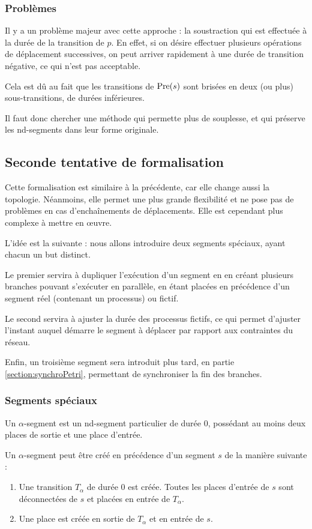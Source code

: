 \subsubsection{Problèmes}
Il y a un problème majeur avec cette approche : la soustraction qui est effectuée à la durée de la transition de $p$. En effet, si on désire effectuer plusieurs opérations de déplacement successives, on peut arriver rapidement à une durée de transition négative, ce qui n'est pas acceptable. 

Cela est dû au fait que les transitions de $\operatorname{Pre}(s)$ sont brisées en deux (ou plus) sous-transitions, de durées inférieures.

Il faut donc chercher une méthode qui permette plus de souplesse, et qui préserve les nd-segments dans leur forme originale.

\subsection{Seconde tentative de formalisation}
Cette formalisation est similaire à la précédente, car elle change aussi la topologie. Néanmoins, elle permet une plus grande flexibilité et ne pose pas de problèmes en cas d'enchaînements de déplacements.
Elle est cependant plus complexe à mettre en œuvre.

L'idée est la suivante : nous allons introduire deux segments spéciaux, ayant chacun un but distinct.

Le premier servira à dupliquer l'exécution d'un segment en en créant plusieurs branches pouvant s'exécuter en parallèle, en étant placées en précédence d'un segment réel (contenant un processus) ou fictif.

Le second servira à ajuster la durée des processus fictifs, ce qui permet d'ajuster l'instant auquel démarre le segment à déplacer par rapport aux contraintes du réseau.

Enfin, un troisième segment sera introduit plus tard, en partie \ref{section:synchroPetri}, permettant de synchroniser la fin des branches.

\subsubsection{Segments spéciaux}
\label{section:alphasegment}
\begin{mydef}
Un $\alpha$-segment est un nd-segment particulier de durée $0$, possédant au moins deux places de sortie et une place d'entrée.
\end{mydef}
Un $\alpha$-segment peut être créé en précédence d'un segment $s$ de la manière suivante : 
\begin{enumerate}
\item Une transition $T_\alpha$ de durée 0 est créée. Toutes les places d'entrée de $s$ sont déconnectées de $s$ et placées en entrée de $T_\alpha$.
\item Une place est créée en sortie de $T_\alpha$ et en entrée de $s$. 
\end{enumerate}

